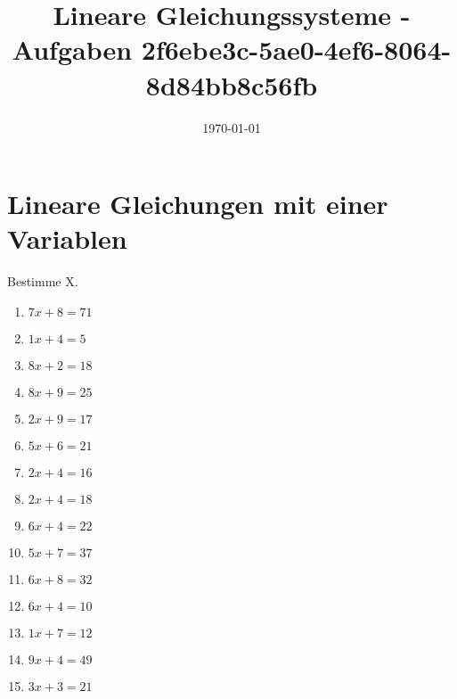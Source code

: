 \documentclass{article}%
\title{Lineare Gleichungssysteme - Aufgaben \newline 2f6ebe3c-5ae0-4ef6-8064-8d84bb8c56fb}%
\date{\today}%
\begin{document}
%
\normalsize%
\maketitle%
\section{Lineare Gleichungen mit einer Variablen}%
\label{sec:LineareGleichungenmiteinerVariablen}%
Bestimme X.%
\begin{enumerate}[label=\alph*)]%
\item%
\newline\vspace{0.5cm} $7x+8=71$%
\item%
\newline\vspace{0.5cm} $1x+4=5$%
\item%
\newline\vspace{0.5cm} $8x+2=18$%
\item%
\newline\vspace{0.5cm} $8x+9=25$%
\item%
\newline\vspace{0.5cm} $2x+9=17$%
\item%
\newline\vspace{0.5cm} $5x+6=21$%
\item%
\newline\vspace{0.5cm} $2x+4=16$%
\item%
\newline\vspace{0.5cm} $2x+4=18$%
\item%
\newline\vspace{0.5cm} $6x+4=22$%
\item%
\newline\vspace{0.5cm} $5x+7=37$%
\item%
\newline\vspace{0.5cm} $6x+8=32$%
\item%
\newline\vspace{0.5cm} $6x+4=10$%
\item%
\newline\vspace{0.5cm} $1x+7=12$%
\item%
\newline\vspace{0.5cm} $9x+4=49$%
\item%
\newline\vspace{0.5cm} $3x+3=21$%
\end{enumerate}
\end{document}
